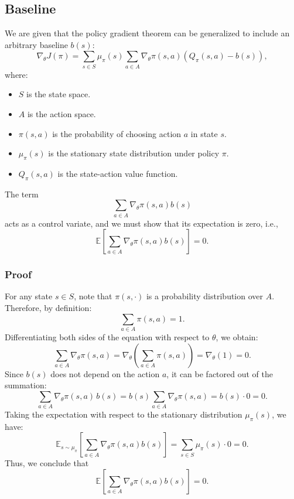 \subsection{Baseline}

We are given that the policy gradient theorem can be generalized to include an arbitrary baseline $b(s)$:
\[
\nabla_\theta J(\pi) = \sum_{s \in S} \mu_\pi(s) \sum_{a \in A} \nabla_\theta \pi(s,a) \left( Q_\pi(s,a) - b(s) \right),
\]
where:
\begin{itemize}
    \item $S$ is the state space.
    \item $A$ is the action space.
    \item $\pi(s,a)$ is the probability of choosing action $a$ in state $s$.
    \item $\mu_\pi(s)$ is the stationary state distribution under policy $\pi$.
    \item $Q_\pi(s,a)$ is the state-action value function.
\end{itemize}
The term 
\[
\sum_{a \in A} \nabla_\theta \pi(s,a) b(s)
\]
acts as a control variate, and we must show that its expectation is zero, i.e.,
\[
\mathbb{E}\!\left[ \sum_{a \in A} \nabla_\theta \pi(s,a)b(s) \right] = 0.
\]

\subsubsection*{Proof}

For any state $s\in S$, note that $\pi(s,\cdot)$ is a probability distribution over $A$. Therefore, by definition:
\[
\sum_{a \in A} \pi(s,a) = 1.
\]
Differentiating both sides of the equation with respect to $\theta$, we obtain:
\[
\sum_{a \in A} \nabla_\theta \pi(s,a) = \nabla_\theta \left( \sum_{a \in A} \pi(s,a) \right) = \nabla_\theta (1) = 0.
\]
Since $b(s)$ does not depend on the action $a$, it can be factored out of the summation:
\[
\sum_{a \in A} \nabla_\theta \pi(s,a) \, b(s) = b(s) \sum_{a \in A} \nabla_\theta \pi(s,a) = b(s) \cdot 0 = 0.
\]
Taking the expectation with respect to the stationary distribution $\mu_\pi(s)$, we have:
\[
\mathbb{E}_{s\sim\mu_\pi}\!\left[ \sum_{a \in A} \nabla_\theta \pi(s,a)b(s) \right] = \sum_{s \in S} \mu_\pi(s) \cdot 0 = 0.
\]
Thus, we conclude that
\[
\mathbb{E}\!\left[ \sum_{a \in A} \nabla_\theta \pi(s,a)b(s) \right] = 0.
\]